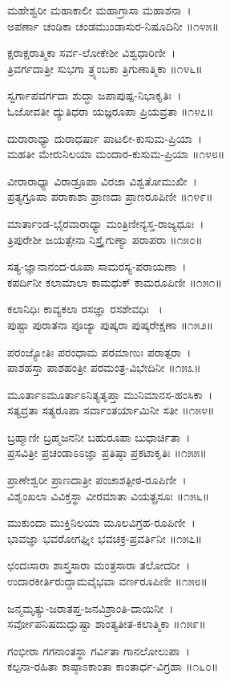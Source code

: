 ಮಹೇಶ್ವರೀ ಮಹಾಕಾಲೀ ಮಹಾಗ್ರಾಸಾ ಮಹಾಶನಾ~।\\
ಅಪರ್ಣಾ ಚಂಡಿಕಾ ಚಂಡಮುಂಡಾಸುರ-ನಿಷೂದಿನೀ ॥೧೪೫॥

ಕ್ಷರಾಕ್ಷರಾತ್ಮಿಕಾ ಸರ್ವ-ಲೋಕೇಶೀ ವಿಶ್ವಧಾರಿಣೀ~।\\
ತ್ರಿವರ್ಗದಾತ್ರೀ ಸುಭಗಾ ತ್ರ್ಯಂಬಕಾ ತ್ರಿಗುಣಾತ್ಮಿಕಾ ॥೧೪೬॥

ಸ್ವರ್ಗಾಪವರ್ಗದಾ ಶುದ್ಧಾ ಜಪಾಪುಷ್ಪ-ನಿಭಾಕೃತಿಃ~।\\
ಓಜೋವತೀ ದ್ಯುತಿಧರಾ ಯಜ್ಞರೂಪಾ ಪ್ರಿಯವ್ರತಾ ॥೧೪೭॥

ದುರಾರಾಧ್ಯಾ ದುರಾಧರ್ಷಾ ಪಾಟಲೀ-ಕುಸುಮ-ಪ್ರಿಯಾ~।\\
ಮಹತೀ ಮೇರುನಿಲಯಾ ಮಂದಾರ-ಕುಸುಮ-ಪ್ರಿಯಾ ॥೧೪೮॥

ವೀರಾರಾಧ್ಯಾ ವಿರಾಡ್ರೂಪಾ ವಿರಜಾ ವಿಶ್ವತೋಮುಖೀ~।\\
ಪ್ರತ್ಯಗ್ರೂಪಾ ಪರಾಕಾಶಾ ಪ್ರಾಣದಾ ಪ್ರಾಣರೂಪಿಣೀ ॥೧೪೯॥

ಮಾರ್ತಾಂಡ-ಭೈರವಾರಾಧ್ಯಾ ಮಂತ್ರಿಣೀನ್ಯಸ್ತ-ರಾಜ್ಯಧೂಃ~।\\
ತ್ರಿಪುರೇಶೀ ಜಯತ್ಸೇನಾ ನಿಸ್ತ್ರೈಗುಣ್ಯಾ ಪರಾಪರಾ ॥೧೫೦॥

ಸತ್ಯ-ಜ್ಞಾನಾನಂದ-ರೂಪಾ ಸಾಮರಸ್ಯ-ಪರಾಯಣಾ~।\\
ಕಪರ್ದಿನೀ ಕಲಾಮಾಲಾ ಕಾಮಧುಕ್ ಕಾಮರೂಪಿಣೀ ॥೧೫೧॥

ಕಲಾನಿಧಿಃ ಕಾವ್ಯಕಲಾ ರಸಜ್ಞಾ ರಸಶೇವಧಿಃ ~।\\
ಪುಷ್ಟಾ ಪುರಾತನಾ ಪೂಜ್ಯಾ ಪುಷ್ಕರಾ ಪುಷ್ಕರೇಕ್ಷಣಾ ॥೧೫೨॥

ಪರಂಜ್ಯೋತಿಃ ಪರಂಧಾಮ ಪರಮಾಣುಃ ಪರಾತ್ಪರಾ~।\\
ಪಾಶಹಸ್ತಾ ಪಾಶಹಂತ್ರೀ ಪರಮಂತ್ರ-ವಿಭೇದಿನೀ ॥೧೫೩॥

ಮೂರ್ತಾಽಮೂರ್ತಾಽನಿತ್ಯತೃಪ್ತಾ ಮುನಿಮಾನಸ-ಹಂಸಿಕಾ~।\\
ಸತ್ಯವ್ರತಾ ಸತ್ಯರೂಪಾ ಸರ್ವಾಂತರ್ಯಾಮಿನೀ ಸತೀ ॥೧೫೪॥

ಬ್ರಹ್ಮಾಣೀ ಬ್ರಹ್ಮಜನನೀ ಬಹುರೂಪಾ ಬುಧಾರ್ಚಿತಾ~।\\
ಪ್ರಸವಿತ್ರೀ ಪ್ರಚಂಡಾಽಽಜ್ಞಾ ಪ್ರತಿಷ್ಠಾ ಪ್ರಕಟಾಕೃತಿಃ ॥೧೫೫॥

ಪ್ರಾಣೇಶ್ವರೀ ಪ್ರಾಣದಾತ್ರೀ ಪಂಚಾಶತ್ಪೀಠ-ರೂಪಿಣೀ~।\\
ವಿಶೃಂಖಲಾ ವಿವಿಕ್ತಸ್ಥಾ ವೀರಮಾತಾ ವಿಯತ್ಪ್ರಸೂಃ ॥೧೫೬॥

ಮುಕುಂದಾ ಮುಕ್ತಿನಿಲಯಾ ಮೂಲವಿಗ್ರಹ-ರೂಪಿಣೀ~।\\
ಭಾವಜ್ಞಾ ಭವರೋಗಘ್ನೀ ಭವಚಕ್ರ-ಪ್ರವರ್ತಿನೀ ॥೧೫೭॥

ಛಂದಃಸಾರಾ ಶಾಸ್ತ್ರಸಾರಾ ಮಂತ್ರಸಾರಾ ತಲೋದರೀ~।\\
ಉದಾರಕೀರ್ತಿರುದ್ದಾಮವೈಭವಾ ವರ್ಣರೂಪಿಣೀ ॥೧೫೮॥

ಜನ್ಮಮೃತ್ಯು-ಜರಾತಪ್ತ-ಜನವಿಶ್ರಾಂತಿ-ದಾಯಿನೀ~।\\
ಸರ್ವೋಪನಿಷದುದ್ಘುಷ್ಟಾ ಶಾಂತ್ಯತೀತ-ಕಲಾತ್ಮಿಕಾ ॥೧೫೯॥

ಗಂಭೀರಾ ಗಗನಾಂತಸ್ಥಾ ಗರ್ವಿತಾ ಗಾನಲೋಲುಪಾ~।\\
ಕಲ್ಪನಾ-ರಹಿತಾ ಕಾಷ್ಠಾಽಕಾಂತಾ ಕಾಂತಾರ್ಧ-ವಿಗ್ರಹಾ ॥೧೬೦॥

